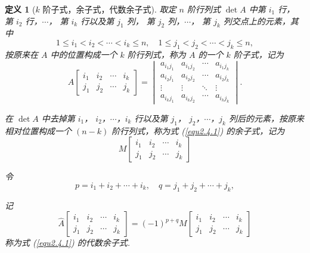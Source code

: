 \documentclass[10pt,openany]{article}
\theoremstyle{thmstyle} %
\theoremstyle{defstyle} %
\newtheorem{definition}[theorem]{定义}
\theoremstyle{prostyle} %
\theoremstyle{exastyle}
\theoremstyle{remstyle}
\begin{document}
\begin{definition}[\( k \) 阶子式，余子式，代数余子式]
	取定 \( n \) 阶行列式 \( \det A \) 中第 \( i_1 \) 行， 第 \( i_2 \) 行，\( \cdots \)， 第 \( i_k \) 行以及第 \( j_1 \) 列， 第 \( j_2 \) 列，\( \cdots \)， 第 \( j_k \) 列交点上的元素，其中
	\[
	1 \leq i_1 < i_2 < \cdots < i_k \leq n, \quad 1 \leq j_1 < j_2 < \cdots < j_k \leq n,
	\]
	按原来在 \( A \) 中的位置构成一个 \( k \) 阶行列式，称为 \( A \) 的一个 \( k \) 阶子式，记为
	\begin{equation}
		A\begin{bmatrix}
			i_1 & i_2 & \cdots & i_k \\
			j_1 & j_2 & \cdots & j_k
		\end{bmatrix}
		= \begin{vmatrix}
			a_{i_1 j_1} & a_{i_1 j_2} & \cdots & a_{i_1 j_k} \\
			a_{i_2 j_1} & a_{i_2 j_2} & \cdots & a_{i_2 j_k} \\
			\vdots & \vdots & \ddots & \vdots \\
			a_{i_k j_1} & a_{i_k j_2} & \cdots & a_{i_k j_k}
		\end{vmatrix}. 
		\label{equ2.4.1}
	\end{equation}

	在 \( \det A \) 中去掉第 \( i_1 \)， \( i_2 \)，\( \cdots \)，\( i_k \) 行以及第 \( j_1 \)， \( j_2 \)，\( \cdots \)，\( j_k \) 列后的元素，按原来相对位置构成一个 \( (n-k) \) 阶行列式，称为式 (\ref{equ2.4.1}) 的余子式，记为
	\[
	M\begin{bmatrix}
		i_1 & i_2 & \cdots & i_k \\
		j_1 & j_2 & \cdots & j_k
	\end{bmatrix}
	\]
	
	令
	\[
	p = i_1 + i_2 + \cdots + i_k, \quad
	q = j_1 + j_2 + \cdots + j_k,
	\]
	
	记
	\[
	\hat{A}\begin{bmatrix}
		i_1 & i_2 & \cdots & i_k \\
		j_1 & j_2 & \cdots & j_k
	\end{bmatrix}
	= (-1)^{p + q} M\begin{bmatrix}
		i_1 & i_2 & \cdots & i_k \\
		j_1 & j_2 & \cdots & j_k
	\end{bmatrix}
	\]
	称为式 (\ref{equ2.4.1}) 的代数余子式.
	
\end{definition}
\end{document}
